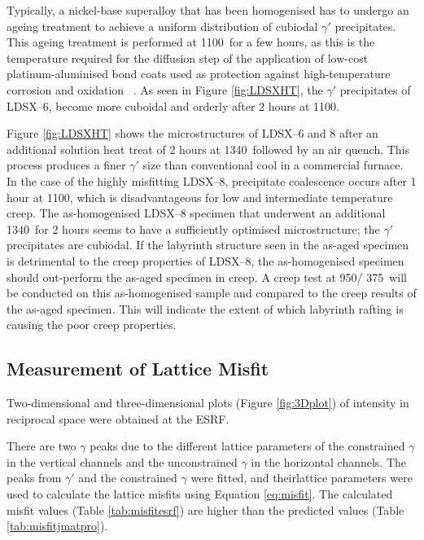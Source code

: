\vspace{-8mm}
%
Typically, a nickel-base superalloy that has been homogenised has to undergo an ageing treatment to achieve a uniform distribution of cubiodal $\gamma'$ precipitates.  This ageing treatment is performed at 1100\celsius\ for a few hours, as this is the temperature required for the diffusion step of the application of low-cost platinum-aluminised bond coats used as protection against high-temperature corrosion and oxidation ~\cite{reed06}.  As seen in Figure \ref{fig:LDSXHT}, the $\gamma'$ precipitates of LDSX--6, become more cuboidal and orderly after 2 hours at 1100\celsius .  

Figure \ref{fig:LDSXHT} shows the microstructures of LDSX--6 and 8 after an additional solution heat treat of 2 hours at 1340\celsius\ followed by an air quench.  This process produces a finer $\gamma'$ size than conventional cool in a commercial furnace.  In the case of the highly misfitting LDSX--8, precipitate coalescence occurs after 1 hour at 1100\celsius, which is disadvantageous for low and intermediate temperature creep.  The as-homogenised LDSX--8 specimen that underwent an additional 1340\celsius\ for 2 hours seems to have a sufficiently optimised microstructure; the $\gamma'$ precipitates are cubiodal.  If the labyrinth structure seen in the as-aged specimen is detrimental to the creep properties of LDSX--8, the as-homogenised specimen should out-perform the as-aged specimen in creep.  A creep test at 950\celsius/ 375\mega\pascal\ will be conducted on this as-homogenised sample and compared to the creep results of the as-aged specimen.  This will indicate the extent of which labyrinth rafting is causing the poor creep properties.

\subsection{Measurement of Lattice Misfit}

Two-dimensional and three-dimensional plots (Figure \ref{fig:3Dplot}) of intensity in reciprocal space were obtained at the ESRF. 





There are two $\gamma$ peaks due to the different lattice parameters of the constrained $\gamma$ in the vertical channels and the unconstrained $\gamma$ in the horizontal channels.  The peaks from $\gamma'$ and the constrained $\gamma$ were fitted, and theirlattice parameters were used to calculate the lattice misfits using Equation \eqref{eq:misfit}.  The calculated misfit values (Table \ref{tab:misfitesrf}) are higher than the predicted values (Table \ref{tab:misfitjmatpro}). 
 

